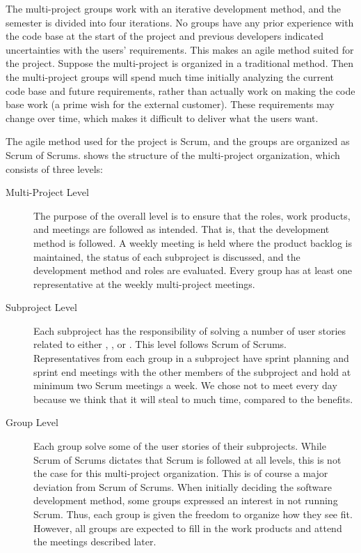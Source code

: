 The multi-project groups work with an iterative development method, and the semester is divided into four iterations. No groups have any prior experience with the code base at the start of the project and previous developers indicated uncertainties with the users' requirements. This makes an agile method suited for the project. Suppose the multi-project is organized in a traditional method. Then the multi-project groups will spend much time initially analyzing the current code base and future requirements, rather than actually work on making the code base work (a prime wish for the external customer). These requirements may change over time, which makes it difficult to deliver what the users want.

The agile method used for the project is Scrum, and the groups are organized as Scrum of Scrums.  shows the structure of the multi-project organization, which consists of three levels:

\begin{description}
  \item[Multi-Project Level] The purpose of the overall level is to ensure that the roles, work products, and meetings are followed as intended. That is, that the development method is followed. A weekly meeting is held where the product backlog is maintained, the status of each subproject is discussed, and the development method and roles are evaluated. Every group has at least one representative at the weekly multi-project meetings.
  \item[Subproject Level] Each subproject has the responsibility of solving a number of user stories related to either \gui, \db, or \bd. This level follows Scrum of Scrums. Representatives from each group in a subproject have sprint planning and sprint end meetings with the other members of the subproject and hold at minimum two Scrum meetings a week. We chose not to meet every day because we think that it will steal to much time, compared to the benefits. 
  \item[Group Level] Each group solve some of the user stories of their subprojects. While Scrum of Scrums dictates that Scrum is followed at all levels, this is not the case for this multi-project organization. This is of course a major deviation from Scrum of Scrums. When initially deciding the software development method, some groups expressed an interest in not running Scrum. Thus, each group is given the freedom to organize how they see fit. However, all groups are expected to fill in the work products and attend the meetings described later.
\end{description}

